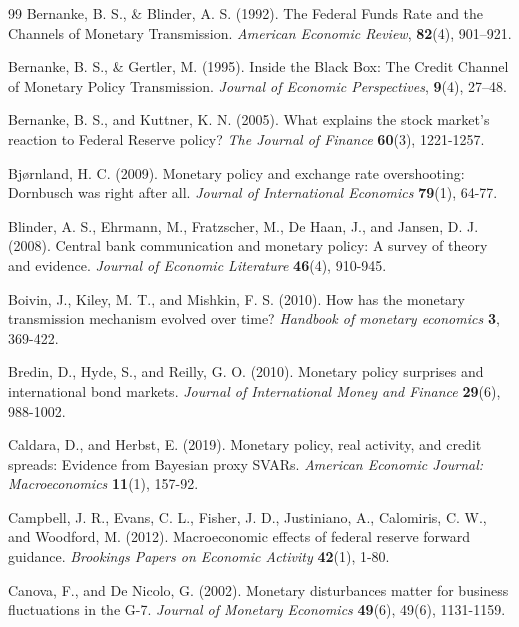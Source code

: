 \documentclass[12pt, reqno]{article}
\begin{document}
\begin{thebibliography}{99}
\bibitem{} \hypertarget{Bernanke and Blinder (1992)}{}Bernanke, B. S., \& Blinder, A. S. (1992). The Federal Funds Rate and the Channels of Monetary Transmission. \textit{American Economic Review}, \textbf{82}(4), 901–921.

\bibitem{} \hypertarget{Bernanke and Gertler (1995)}{}Bernanke, B. S., \& Gertler, M. (1995). Inside the Black Box: The Credit Channel of Monetary Policy Transmission. \textit{Journal of Economic Perspectives}, \textbf{9}(4), 27–48.

\bibitem{} \hypertarget{Bernanke and Kuttner (2005)}{} 
Bernanke, B. S., and Kuttner, K. N. (2005). What explains the stock market's reaction to Federal Reserve policy? \textit{The Journal of Finance} \textbf{60}(3), 1221-1257.

\bibitem{} \hypertarget{Bjørnland (2009)}{}Bjørnland, H. C. (2009). Monetary policy and exchange rate overshooting: Dornbusch was right after all. \textit{Journal of International Economics} \textbf{79}(1), 64-77.

\bibitem{} \hypertarget{Blinder et al. (2008)}{}Blinder, A. S., Ehrmann, M., Fratzscher, M., De Haan, J., and Jansen, D. J. (2008). Central bank communication and monetary policy: A survey of theory and evidence. \textit{Journal of Economic Literature} \textbf{46}(4), 910-945.

\bibitem{} \hypertarget{Boivin, et al. (2010)}{}Boivin, J., Kiley, M. T., and Mishkin, F. S. (2010). How has the monetary transmission mechanism evolved over time? \textit{Handbook of monetary economics} \textbf{3}, 369-422.

\bibitem{} \hypertarget{Bredin et al. (2010)}{}Bredin, D., Hyde, S., and Reilly, G. O. (2010). Monetary policy surprises and international bond markets. \textit{Journal of International Money and Finance} \textbf{29}(6), 988-1002.

\bibitem{} \hypertarget{Caldara and Herbst (2019)}{} Caldara, D., and Herbst, E. (2019). Monetary policy, real activity, and credit spreads: Evidence from Bayesian proxy SVARs. \textit{American Economic Journal: Macroeconomics} \textbf{11}(1), 157-92.

\bibitem{} \hypertarget{Campbell et al. (2012)}{} Campbell, J. R., Evans, C. L., Fisher, J. D., Justiniano, A., Calomiris, C. W., and Woodford, M. (2012). Macroeconomic effects of federal reserve forward guidance. \textit{Brookings Papers on Economic Activity} \textbf{42}(1), 1-80.

\bibitem{} \hypertarget{Canova and De Nicolo (2002)}{}Canova, F., and De Nicolo, G. (2002). Monetary disturbances matter for business fluctuations in the G-7. \textit{Journal of Monetary Economics} \textbf{49}(6), 49(6), 1131-1159.


\end{thebibliography}
\end{document}
